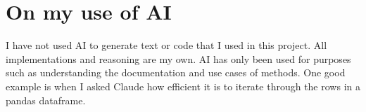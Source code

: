 \documentclass{article}
\begin{document}
\section*{On my use of AI}

I have not used AI to generate text or code that I used in this project.
All implementations and reasoning are my own.
AI has only been used for purposes such as understanding the documentation and use cases of methods.
One good example is when I asked Claude how efficient it is to iterate through the rows 
in a pandas dataframe.
\end{document}
